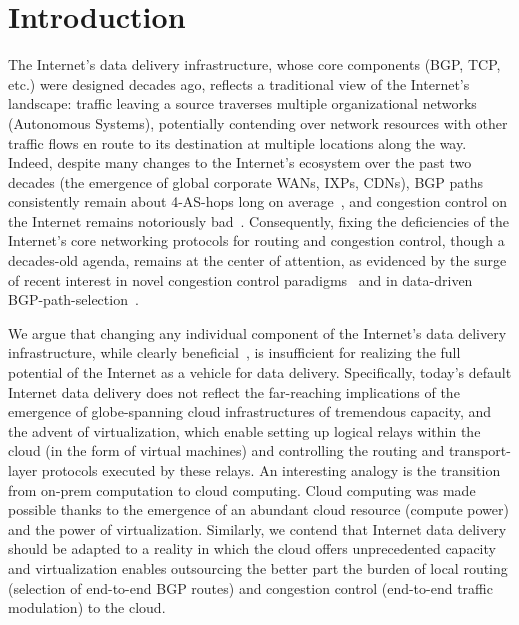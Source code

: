 \documentclass[sigconf,usenames,dvipsnames,geometry]{acmart}
\begin{document}
\section{Introduction}

The Internet's data delivery infrastructure, whose core components (BGP, TCP, etc.) were designed decades ago, reflects a traditional view of the Internet's landscape: traffic leaving a source traverses multiple organizational networks (Autonomous Systems), potentially contending over network resources with other traffic flows en route to its destination at multiple locations along the way. Indeed, despite many changes to the Internet's ecosystem over the past two decades (the emergence of global corporate WANs, IXPs, CDNs), BGP paths consistently remain about 4-AS-hops long on average~\cite{x}, and congestion control on the Internet remains notoriously bad~\cite{PCC}. Consequently, fixing the deficiencies of the Internet's core networking protocols for routing and congestion control, though a decades-old agenda, remains at the center of attention, as evidenced by the surge of recent interest in novel congestion control paradigms~\cite{x,x,x,x,x,x} and in data-driven BGP-path-selection~\cite{x,y}.

We argue that changing any individual component of the Internet's data delivery infrastructure, while clearly beneficial~\cite{x,x,x,x}, is insufficient for realizing the full potential of the Internet as a vehicle for data delivery. Specifically, today's default Internet data delivery does not reflect the far-reaching implications of the emergence of globe-spanning cloud infrastructures of tremendous capacity, and the advent of virtualization, which enable setting up logical relays within the cloud (in the form of virtual machines) and controlling the routing and transport-layer protocols executed by these relays. An interesting analogy is the transition from on-prem computation to cloud computing. Cloud computing was made possible thanks to the emergence of an abundant cloud resource (compute power) and the power of virtualization. Similarly, we contend that Internet data delivery should be adapted to a reality in which the cloud offers unprecedented capacity and virtualization enables outsourcing the better part the burden of local routing (selection of end-to-end BGP routes) and congestion control (end-to-end traffic modulation) to the cloud.
\end{document}
